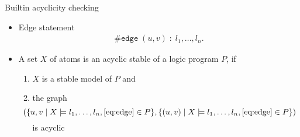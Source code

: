\begin{frame}{Builtin acyclicity checking}
  \bigskip
  \begin{itemize}
  \item<1-> Edge statement
    \begin{align}\label{eq:edge}
      \#\mathtt{edge}\; (u,v)\; :\; l_1,\dots,l_n.
    \end{align}
  \item <2-> A set $X$ of atoms is an acyclic stable of a logic program $P$, if
    \smallskip
    \begin{enumerate}\normalsize
    \item $X$ is a stable model of $P$ and
      \smallskip
    \item the graph
      {\small
      \[\hspace{-15pt}
      (\{u,v\mid X\models l_1,\dots,l_n, \eqref{eq:edge}\in P\},\{(u,v)\mid X\models l_1,\dots,l_n, \eqref{eq:edge}\in P\})
      \]}%
      is acyclic
    \end{enumerate}
  \end{itemize}
\end{frame}
%
